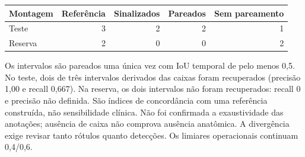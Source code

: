 {\begin{center}\small\begin{tabular}{lrrrr}\toprule Montagem & Referência & Sinalizados & Pareados & Sem pareamento\\\midrule

Teste & 3 & 2 & 2 & 1\\

Reserva & 2 & 0 & 0 & 2\\

\bottomrule\end{tabular}\end{center}

Os intervalos são pareados uma única vez com IoU temporal de pelo menos 0,5. No teste, dois de três intervalos derivados das caixas foram recuperados (precisão 1,00 e recall 0,667). Na reserva, os dois intervalos não foram recuperados: recall 0 e precisão não definida. São índices de concordância com uma referência construída, não sensibilidade clínica. Não foi confirmada a exaustividade das anotações; ausência de caixa não comprova ausência anatômica. A divergência exige revisar tanto rótulos quanto detecções. Os limiares operacionais continuam 0,4/0,6.
}
